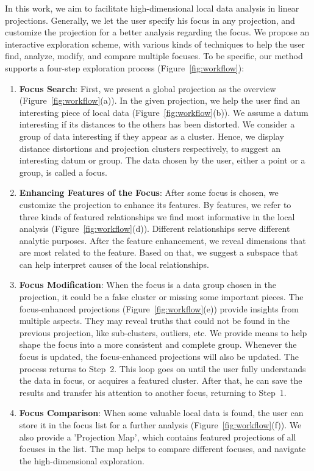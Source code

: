 In this work, we aim to facilitate high-dimensional local data analysis in linear projections. Generally, we let the user specify his focus in any projection, and customize the projection for a better analysis regarding the focus. We propose an interactive exploration scheme, with various kinds of techniques to help the user find, analyze, modify, and compare multiple focuses. To be specific, our method supports a four-step exploration process (Figure~\ref{fig:workflow}):
\begin{enumerate}[Step. 1:]
 \item \textbf{Focus Search}: First, we present a global projection as the overview (Figure~\ref{fig:workflow}(a)). In the given projection, we help the user find an interesting piece of local data (Figure~\ref{fig:workflow}(b)). We assume a datum interesting if its distances to the others has been distorted. We consider a group of data interesting if they appear as a cluster. Hence, we display distance distortions and projection clusters respectively, to suggest an interesting datum or group. The data chosen by the user, either a point or a group, is called a focus.
 \item \textbf{Enhancing Features of the Focus}: After some focus is chosen, we customize the projection to enhance its features. By features, we refer to three kinds of featured relationships we find most informative in the local analysis (Figure~\ref{fig:workflow}(d)). Different relationships serve different analytic purposes. After the feature enhancement, we reveal dimensions that are most related to the feature. Based on that, we suggest a subspace that can help interpret causes of the local relationships.
 \item \textbf{Focus Modification}: When the focus is a data group chosen in the projection, it could be a false cluster or missing some important pieces. The focus-enhanced projections (Figure~\ref{fig:workflow}(e)) provide insights from multiple aspects. They may reveal truths that could not be found in the previous projection, like sub-clusters, outliers, etc. We provide means to help shape the focus into a more consistent and complete group. Whenever the focus is updated, the focus-enhanced projections will also be updated. The process returns to Step~2. This loop goes on until the user fully understands the data in focus, or acquires a featured cluster. After that, he can save the results and transfer his attention to another focus, returning to Step~1.
 \item \textbf{Focus Comparison}: When some valuable local data is found, the user can store it in the focus list for a further analysis (Figure~\ref{fig:workflow}(f)). We also provide a 'Projection Map', which contains featured projections of all focuses in the list. The map helps to compare different focuses, and navigate the high-dimensional exploration.
\end{enumerate}
